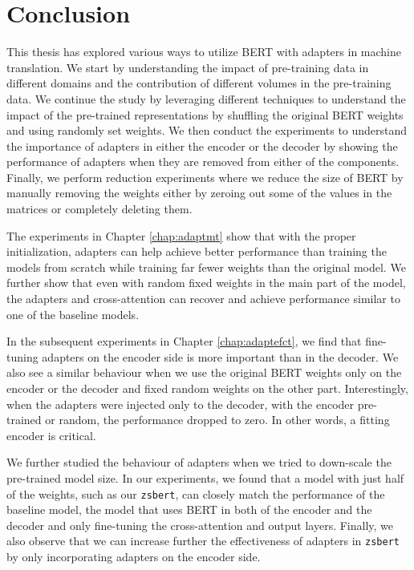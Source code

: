 \chapter*{Conclusion}
This thesis has explored various ways to utilize BERT with adapters in machine translation. We start by understanding the impact of pre-training data in different domains and the contribution of different volumes in the pre-training data. We continue the study by leveraging different techniques to understand the impact of the pre-trained representations by shuffling the original BERT weights and using randomly set weights. We then conduct the experiments to understand the importance of adapters in either the encoder or the decoder by showing the performance of adapters when they are removed from either of the components. Finally, we perform reduction experiments where we reduce the size of BERT by manually removing the weights either by zeroing out some of the values in the matrices or completely deleting them.

The experiments in Chapter \ref{chap:adaptmt} show that with the proper initialization, adapters can help achieve better performance than training the models from scratch while training far fewer weights than the original model. We further show that even with random fixed weights in the main part of the model, the adapters and cross-attention can recover and achieve performance similar to one of the baseline models.

In the subsequent experiments in Chapter \ref{chap:adaptefct}, we find that fine-tuning adapters on the encoder side is more important than in the decoder. We also see a similar behaviour when we use the original BERT weights only on the encoder or the decoder and fixed random weights on the other part. Interestingly, when the adapters were injected only to the decoder, with the encoder pre-trained or random, the performance dropped to zero. In other words, a fitting encoder is critical.

We further studied the behaviour of adapters when we tried to down-scale the pre-trained model size. In our experiments, we found that a model with just half of the weights, such as our \texttt{zsbert}, can closely match the performance of the baseline model, the model that uses BERT in both of the encoder and the decoder and only fine-tuning the cross-attention and output layers. Finally, we also observe that we can increase further the effectiveness of adapters in \texttt{zsbert} by only incorporating adapters on the encoder side.

